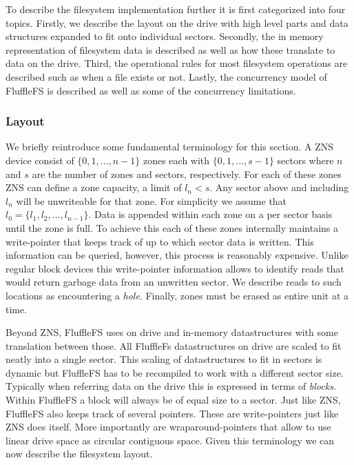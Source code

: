 To describe the filesystem implementation further it is first categorized into
four topics. Firstly, we describe the layout on the drive with high level parts
and data structures expanded to fit onto individual sectors. Secondly, the
in memory representation of filesystem data is described as well as how these
translate to data on the drive. Third, the operational rules for most filesystem
operations are described such as when a file exists or not. Lastly, the
concurrency model of FluffleFS is described as well as some of the concurrency
limitations.

\subsubsection{Layout}

We briefly reintroduce some fundamental terminology for this section. A ZNS
device consist of $\{0,1,...,n-1\}$ zones each with $\{0,1,...,s-1\}$ sectors
where $n$ and $s$ are the number of zones and sectors, respectively. For each of
these zones ZNS can define a zone capacity, a limit of $l_{n} < s$. Any sector
above and including $l_{n}$ will be unwriteable for that zone. For simplicity we
assume that $l_{0} = \{l_{1},l_{2},...,l_{n-1}\}$. Data is appended within each
zone on a per sector basis until the zone is full. To achieve this each of these
zones internally maintains a write-pointer that keeps track of up to which
sector data is written. This information can be queried, however, this process
is reasonably expensive. Unlike regular block devices this write-pointer
information allows to identify reads that would return garbage data from an
unwritten sector. We describe reads to such locations as encountering a
\textit{hole}. Finally, zones must be erased as entire unit at a time.

Beyond ZNS, FluffleFS uses on drive and in-memory datastructures with some
translation between those. All FluffleFs datastructures on drive are scaled to
fit neatly into a single sector. This scaling of datastructures to fit in
sectors is dynamic but FluffleFS has to be recompiled to work with a different
sector size. Typically when referring data on the drive this is expressed in
terms of \textit{blocks}. Within FluffleFS a block will always be of equal size
to a sector. Just like ZNS, FluffleFS also keeps track of several pointers.
These are write-pointers just like ZNS does itself. More importantly are
wraparound-pointers that allow to use linear drive space as circular contiguous
space. Given this terminology we can now describe the filesystem layout.


